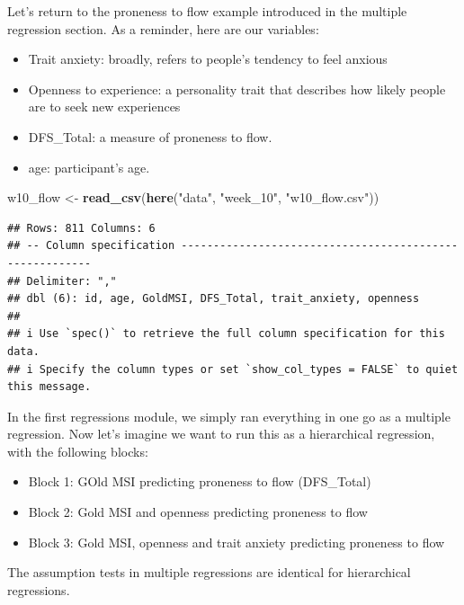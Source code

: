 \documentclass[
]{book}
\newenvironment{Shaded}{\begin{snugshade}}{\end{snugshade}}
\newcommand{\FunctionTok}[1]{\textcolor[rgb]{0.13,0.29,0.53}{\textbf{#1}}}
\newcommand{\NormalTok}[1]{#1}
\newcommand{\OtherTok}[1]{\textcolor[rgb]{0.56,0.35,0.01}{#1}}
\newcommand{\StringTok}[1]{\textcolor[rgb]{0.31,0.60,0.02}{#1}}
\providecommand{\tightlist}{%
  \setlength{\itemsep}{0pt}\setlength{\parskip}{0pt}}
\begin{document}
Let's return to the proneness to flow example introduced in the multiple regression section. As a reminder, here are our variables:

\begin{itemize}
\tightlist
\item
  Trait anxiety: broadly, refers to people's tendency to feel anxious
\item
  Openness to experience: a personality trait that describes how likely people are to seek new experiences
\item
  DFS\_Total: a measure of proneness to flow.
\item
  age: participant's age.
\end{itemize}

\begin{Shaded}
\begin{Highlighting}[]
\NormalTok{w10\_flow }\OtherTok{\textless{}{-}} \FunctionTok{read\_csv}\NormalTok{(}\FunctionTok{here}\NormalTok{(}\StringTok{"data"}\NormalTok{, }\StringTok{"week\_10"}\NormalTok{, }\StringTok{"w10\_flow.csv"}\NormalTok{))}
\end{Highlighting}
\end{Shaded}

\begin{verbatim}
## Rows: 811 Columns: 6
## -- Column specification --------------------------------------------------------
## Delimiter: ","
## dbl (6): id, age, GoldMSI, DFS_Total, trait_anxiety, openness
## 
## i Use `spec()` to retrieve the full column specification for this data.
## i Specify the column types or set `show_col_types = FALSE` to quiet this message.
\end{verbatim}

In the first regressions module, we simply ran everything in one go as a multiple regression. Now let's imagine we want to run this as a hierarchical regression, with the following blocks:

\begin{itemize}
\tightlist
\item
  Block 1: GOld MSI predicting proneness to flow (DFS\_Total)
\item
  Block 2: Gold MSI and openness predicting proneness to flow
\item
  Block 3: Gold MSI, openness and trait anxiety predicting proneness to flow
\end{itemize}

The assumption tests in multiple regressions are identical for hierarchical regressions.
\end{document}
